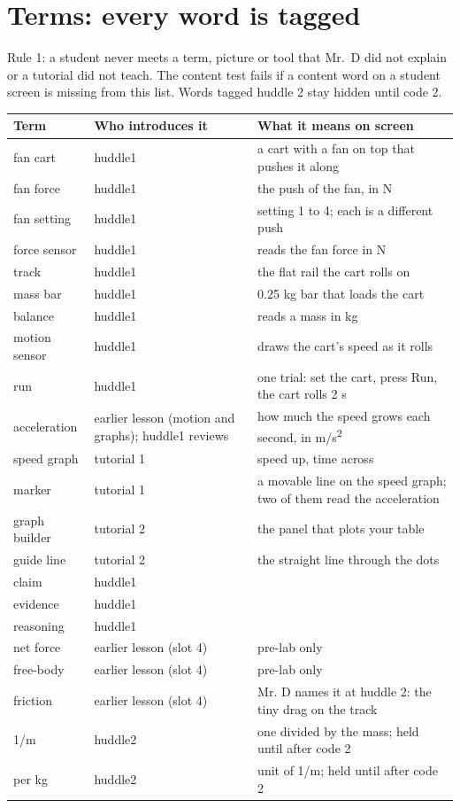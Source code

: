 \documentclass[10pt]{article}
\begin{document}
\section{Terms: every word is tagged}
Rule 1: a student never meets a term, picture or tool that Mr.\ D did not explain or a tutorial did not teach. The content test fails if a content word on a student screen is missing from this list. Words tagged huddle 2 stay hidden until code 2.
\begin{longtable}{@{}p{1.2in} p{1.9in} p{3.4in}@{}}\toprule
\textbf{Term} & \textbf{Who introduces it} & \textbf{What it means on screen}\\\midrule\endhead
fan cart & huddle1 & a cart with a fan on top that pushes it along \\
fan force & huddle1 & the push of the fan, in N \\
fan setting & huddle1 & setting 1 to 4; each is a different push \\
force sensor & huddle1 & reads the fan force in N \\
track & huddle1 & the flat rail the cart rolls on \\
mass bar & huddle1 & 0.25 kg bar that loads the cart \\
balance & huddle1 & reads a mass in kg \\
motion sensor & huddle1 & draws the cart's speed as it rolls \\
run & huddle1 & one trial: set the cart, press Run, the cart rolls 2 s \\
acceleration & earlier lesson (motion and graphs); huddle1 reviews & how much the speed grows each second, in m/s\textsuperscript{2} \\
speed graph & tutorial 1 & speed up, time across \\
marker & tutorial 1 & a movable line on the speed graph; two of them read the acceleration \\
graph builder & tutorial 2 & the panel that plots your table \\
guide line & tutorial 2 & the straight line through the dots \\
claim & huddle1 &  \\
evidence & huddle1 &  \\
reasoning & huddle1 &  \\
net force & earlier lesson (slot 4) & pre-lab only \\
free-body & earlier lesson (slot 4) & pre-lab only \\
friction & earlier lesson (slot 4) & Mr. D names it at huddle 2: the tiny drag on the track \\
1/m & huddle2 & one divided by the mass; held until after code 2 \\
per kg & huddle2 & unit of 1/m; held until after code 2 \\
\bottomrule\end{longtable}
\end{document}
